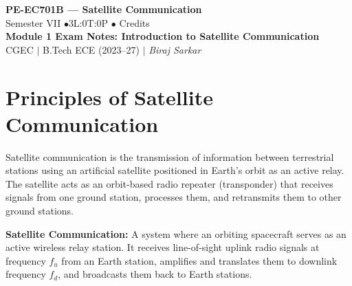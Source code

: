 \documentclass[12pt,a4paper]{article}
\begin{document}

\begin{center}
  {\LARGE\bfseries\color{myred} PE-EC701B --- Satellite Communication}\\[5pt]
  {\normalsize\color{mydark} Semester VII \quad$\bullet$\quad 3L:0T:0P \quad$\bullet$ Credits}\\[3pt]
  {\normalsize\color{myteal}\textbf{Module 1 Exam Notes: Introduction to Satellite Communication}}\\[3pt]
  {\small\color{mydark} CGEC \;$|$\; B.Tech ECE (2023--27) \;$|$\; \textit{Biraj Sarkar}}
\end{center}
\vspace{2pt}
\noindent{\color{myred}\rule{\linewidth}{1.5pt}}
\vspace{2pt}

\hypersetup{linkcolor=mydark}
\tableofcontents
\hypersetup{linkcolor=myteal}
\newpage

\section{Principles of Satellite Communication}

Satellite communication is the transmission of information between terrestrial stations using an artificial satellite positioned in Earth's orbit as an active relay. The satellite acts as an orbit-based radio repeater (transponder) that receives signals from one ground station, processes them, and retransmits them to other ground stations.

\begin{tcolorbox}[defbox]
\textbf{Satellite Communication:} A system where an orbiting spacecraft serves as an active wireless relay station. It receives line-of-sight uplink radio signals at frequency $f_u$ from an Earth station, amplifies and translates them to downlink frequency $f_d$, and broadcasts them back to Earth stations.
\end{tcolorbox}
\end{document}
